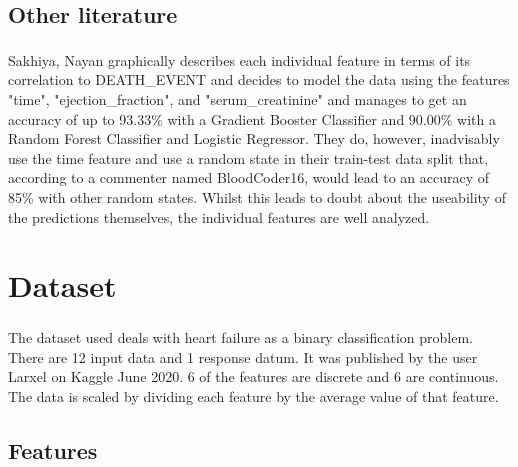 \documentclass[a4paper, UKenglish]{article}
\newcommand{\0}{\mathbf{0}}
\newcommand{\1}{\mathbf{1}}
\newcommand{\citesup}[1]{\textsuperscript{\cite{#1}}}
\begin{document}
\subsection{Other literature}
Sakhiya, Nayan\citesup{nayan} graphically describes each individual feature in terms of its correlation to DEATH\_EVENT and decides to model the data using the features "time", "ejection\_fraction", and "serum\_creatinine" and manages to get an accuracy of up to 93.33\% with a Gradient Booster Classifier and 90.00\% with a Random Forest Classifier and Logistic Regressor. They do, however, inadvisably use the time feature and use a random state in their train-test data split that, according to a commenter named BloodCoder16, would lead to an accuracy of 85\% with other random states. Whilst this leads to doubt about the useability of the predictions themselves, the individual features are well analyzed.

\section{Dataset}
The dataset used\citesup{dataset} deals with heart failure as a binary classification problem. There are 12 input data and 1 response datum. It was published by the user Larxel on Kaggle June 2020. 6 of the features are discrete and 6 are continuous. The data is scaled by dividing each feature by the average value of that feature.

\subsection{Features}
\end{document}
